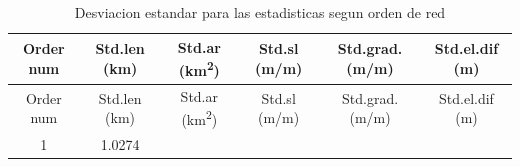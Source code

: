 \documentclass[11pt,]{article}
\begin{document}
\begin{longtable}[]{@{}cccccc@{}}
\caption{\label{tab:estad} Desviacion estandar para las estadisticas
segun orden de red}\tabularnewline
\toprule
\begin{minipage}[b]{0.08\columnwidth}\centering\strut
Order num\strut
\end{minipage} & \begin{minipage}[b]{0.11\columnwidth}\centering\strut
Std.len (km)\strut
\end{minipage} & \begin{minipage}[b]{0.26\columnwidth}\centering\strut
Std.ar (km\textsuperscript{2})\strut
\end{minipage} & \begin{minipage}[b]{0.11\columnwidth}\centering\strut
Std.sl (m/m)\strut
\end{minipage} & \begin{minipage}[b]{0.14\columnwidth}\centering\strut
Std.grad. (m/m)\strut
\end{minipage} & \begin{minipage}[b]{0.13\columnwidth}\centering\strut
Std.el.dif (m)\strut
\end{minipage}\tabularnewline
\midrule
\endfirsthead
\toprule
\begin{minipage}[b]{0.08\columnwidth}\centering\strut
Order num\strut
\end{minipage} & \begin{minipage}[b]{0.11\columnwidth}\centering\strut
Std.len (km)\strut
\end{minipage} & \begin{minipage}[b]{0.26\columnwidth}\centering\strut
Std.ar (km\textsuperscript{2})\strut
\end{minipage} & \begin{minipage}[b]{0.11\columnwidth}\centering\strut
Std.sl (m/m)\strut
\end{minipage} & \begin{minipage}[b]{0.14\columnwidth}\centering\strut
Std.grad. (m/m)\strut
\end{minipage} & \begin{minipage}[b]{0.13\columnwidth}\centering\strut
Std.el.dif (m)\strut
\end{minipage}\tabularnewline
\midrule
\endhead
\begin{minipage}[t]{0.08\columnwidth}\centering\strut
1\strut
\end{minipage} & \begin{minipage}[t]{0.11\columnwidth}\centering\strut
1.0274\strut

\end{minipage}
\end{longtable}
\end{document}
